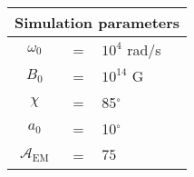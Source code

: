 \begin{tabular}{ccl}
\multicolumn{3}{c}{Simulation parameters} \\
\hline
$\omega_0$  &=& $10^{4}$ rad/s\\
$B_0$  &=& $10^{14}$ G \\
$\chi$  &=& 85$^{\circ}$ \\
$a_0$ &=& 10$^{\circ}$ \\
$\mathcal{A}_{\mathrm{EM}}$ &= & $75$
\end{tabular}
